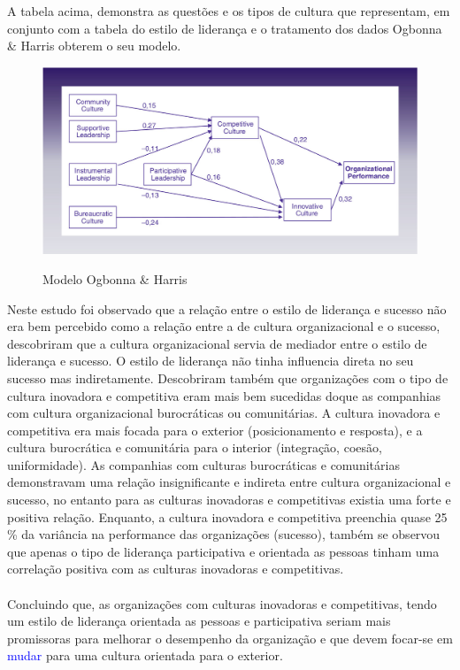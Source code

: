 A tabela acima, demonstra as questões e os tipos de cultura que representam, em conjunto com a tabela do estilo de liderança e o tratamento dos dados Ogbonna \& Harris obterem o seu modelo.
\begin{figure}[H]
\centering
\includegraphics[scale=.35]{"./image/OB/Ogbonna & Harris.jpg"}\\
\caption{Modelo Ogbonna \& Harris \cite{article_1}}
\label{Modelo}
\end{figure}\par
Neste estudo foi observado que a relação entre o estilo de liderança e sucesso não era bem percebido como a relação entre a de cultura organizacional e o sucesso, descobriram que a cultura organizacional servia de mediador entre o estilo de liderança e sucesso. O estilo de liderança não tinha influencia direta no seu sucesso mas indiretamente. Descobriram também que organizações com o tipo de cultura inovadora e competitiva eram mais bem sucedidas doque as companhias com cultura organizacional burocráticas ou comunitárias. A cultura inovadora e competitiva era mais focada para o exterior (posicionamento e resposta), e a cultura burocrática e comunitária para o interior (integração, coesão, uniformidade). As companhias com culturas burocráticas e comunitárias demonstravam uma relação insignificante e indireta entre cultura organizacional e sucesso, no entanto para as culturas inovadoras e competitivas existia uma forte e positiva relação. Enquanto, a cultura inovadora e competitiva preenchia quase 25 \% da variância na performance das organizações (sucesso), também se observou que apenas o tipo de liderança participativa e orientada as pessoas tinham uma correlação positiva com as culturas inovadoras e competitivas.\\
\\
Concluindo que, as organizações com culturas inovadoras e competitivas, tendo um estilo de liderança orientada as pessoas e participativa seriam mais promissoras para melhorar o desempenho da organização e que devem focar-se em \textcolor{blue}{mudar} para uma cultura orientada para o exterior. \cite{article_1} \\
\newpage
